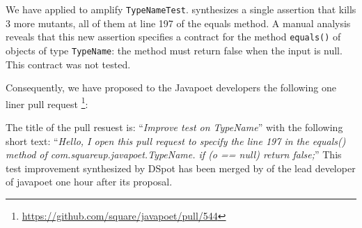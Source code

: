 
We have applied \dspot to amplify \texttt{TypeNameTest}. \dspot  synthesizes a single assertion that kills 3 more mutants, all of them at line 197 of the equals method. 
A manual analysis reveals that this new assertion specifies a contract for the method \texttt{equals()} of objects of type \texttt{TypeName}: the method must return false when the input is null. This contract was not tested.

Consequently, we have proposed to the Javapoet developers the following one liner pull request \footnote{\url{https://github.com/square/javapoet/pull/544}}:
\begin{figure}[H]
	\centering
\end{figure}
The title of the pull resuest is: ``\emph{Improve test on TypeName}'' with the following short text: ``\emph{Hello, I open this pull request to specify the line 197 in the equals() method of com.squareup.javapoet.TypeName. if (o == null) return false;}''
This test improvement synthesized by DSpot has been merged by of the lead developer of javapoet one hour after its proposal.


